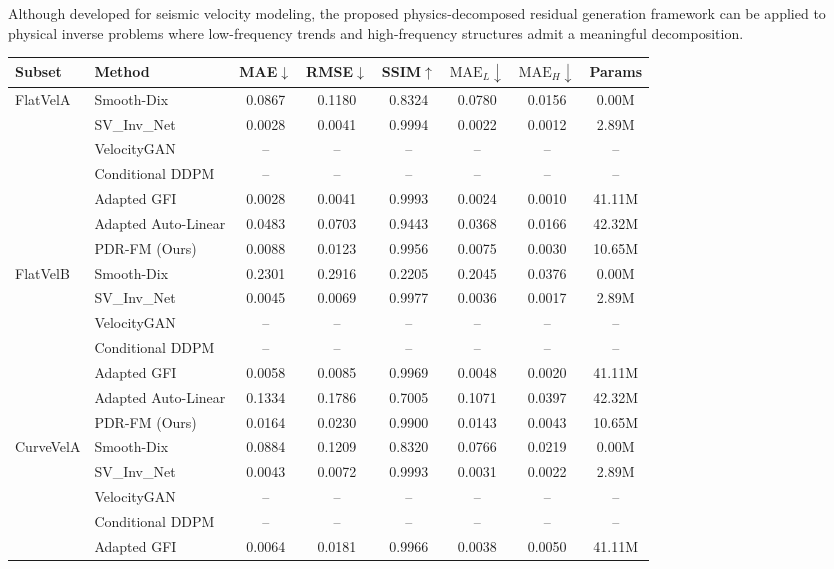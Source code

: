 \documentclass[letterpaper]{article}
\begin{document}
Although developed for seismic velocity modeling, the proposed physics-decomposed residual generation framework can be applied to physical inverse problems where low-frequency trends and high-frequency structures admit a meaningful decomposition.

\begin{table}[t]
\centering
{\scriptsize
\setlength{\tabcolsep}{2pt}
\begin{tabular}{llcccccc}
\hline
Subset & Method & MAE$\downarrow$ & RMSE$\downarrow$ & SSIM$\uparrow$ & $\mathrm{MAE}_L\downarrow$ & $\mathrm{MAE}_H\downarrow$ & Params \\
\hline
FlatVelA & Smooth-Dix & 0.0867 & 0.1180 & 0.8324 & 0.0780 & 0.0156 & 0.00M \\
 & SV\_Inv\_Net & 0.0028 & 0.0041 & 0.9994 & 0.0022 & 0.0012 & 2.89M \\
 & VelocityGAN & -- & -- & -- & -- & -- & -- \\
 & Conditional DDPM & -- & -- & -- & -- & -- & -- \\
 & Adapted GFI & 0.0028 & 0.0041 & 0.9993 & 0.0024 & 0.0010 & 41.11M \\
 & Adapted Auto-Linear & 0.0483 & 0.0703 & 0.9443 & 0.0368 & 0.0166 & 42.32M \\
 & PDR-FM (Ours) & 0.0088 & 0.0123 & 0.9956 & 0.0075 & 0.0030 & 10.65M \\
\hline
FlatVelB & Smooth-Dix & 0.2301 & 0.2916 & 0.2205 & 0.2045 & 0.0376 & 0.00M \\
 & SV\_Inv\_Net & 0.0045 & 0.0069 & 0.9977 & 0.0036 & 0.0017 & 2.89M \\
 & VelocityGAN & -- & -- & -- & -- & -- & -- \\
 & Conditional DDPM & -- & -- & -- & -- & -- & -- \\
 & Adapted GFI & 0.0058 & 0.0085 & 0.9969 & 0.0048 & 0.0020 & 41.11M \\
 & Adapted Auto-Linear & 0.1334 & 0.1786 & 0.7005 & 0.1071 & 0.0397 & 42.32M \\
 & PDR-FM (Ours) & 0.0164 & 0.0230 & 0.9900 & 0.0143 & 0.0043 & 10.65M \\
\hline
CurveVelA & Smooth-Dix & 0.0884 & 0.1209 & 0.8320 & 0.0766 & 0.0219 & 0.00M \\
 & SV\_Inv\_Net & 0.0043 & 0.0072 & 0.9993 & 0.0031 & 0.0022 & 2.89M \\
 & VelocityGAN & -- & -- & -- & -- & -- & -- \\
 & Conditional DDPM & -- & -- & -- & -- & -- & -- \\
 & Adapted GFI & 0.0064 & 0.0181 & 0.9966 & 0.0038 & 0.0050 & 41.11M \\

\end{tabular}}
\end{table}
\end{document}
